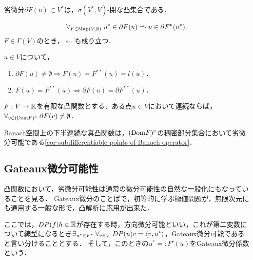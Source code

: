 \documentclass[uplatex,dvipdfmx]{jsreport}
\begin{document}
\begin{corollary}[劣微分は弱閉凸集合]
    劣微分$\partial F(u)\subset V^*$は，$\sigma(V^*,V)$-閉な凸集合である．
\end{corollary}

\begin{corollary}
    \[\forall_{F\in\mathrm{Map}(V,\mathbb{R})}\;u^*\in\partial F(u)\Rightarrow u\in\partial F^*(u^*).\]
    $F\in\Gamma(V)$のとき，$\Leftarrow$も成り立つ．
\end{corollary}

\begin{lemma}[劣微分可能性の必要条件]
    $u\in V$について，
    \begin{enumerate}
        \item $\partial F(u)\ne\emptyset\Rightarrow F(u)=F^{**}(u)=l(u)$．
        \item $F(u)=F^{**}(u)\Rightarrow\partial F(u)=\partial F^{**}(u)$．
    \end{enumerate}
\end{lemma}

\begin{proposition}[凸関数の劣微分可能性の特徴付け]
    $F:V\to\mathbb{R}$を有限な凸関数とする．ある点$u\in V$において連続ならば，$\forall_{v\in(\mathrm{Dom} F)^\circ}\;\partial F(v)\ne\emptyset$．
\end{proposition}
\begin{remark}
    Banach空間上の下半連続な真凸関数は，$(\mathrm{Dom} F)^\circ$の稠密部分集合において劣微分可能である\ref{cor-subdifferentiable-points-of-Banach-operator}．
\end{remark}

\subsection{Gateaux微分可能性}

\begin{tcolorbox}[colframe=ForestGreen, colback=ForestGreen!10!white,breakable,colbacktitle=ForestGreen!40!white,coltitle=black,fonttitle=\bfseries\sffamily,
title=]
    凸関数において，劣微分可能性は通常の微分可能性の自然な一般化にもなっていることを見る．
    Gateaux微分のことばで，初等的に学ぶ極値問題が，無限次元にも通用する一般な形で，凸解析に応用が出来た．
\end{tcolorbox}

\begin{definition}
    ここでは，$DP(f)h\in\overline{\mathbb{R}}$が存在する時，方向微分可能といい，これが第二変数について線型になるとき$\exists_{u^*\in V^*}\;\forall_{v\in V}\;DP(u)v=\langle v,u^*\rangle$，Gateaux微分可能であると言い分けることとする．
    そして，このときの$u^*=:F'(u)$をGateaux微分係数という．
\end{definition}
\end{document}
